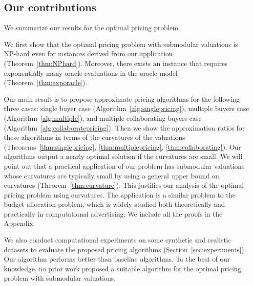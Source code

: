 \documentclass[letterpaper]{article}
\theoremstyle{definition}
\begin{document}




\subsection{Our contributions}

We summarize our results for the optimal pricing problem.

We first show that the optimal pricing problem with submodular valuations is NP-hard even for instances derived from our application (Theorem~\ref{thm:NPhard}).
Moreover, there exists an instance that requires exponentially many oracle evaluations in the oracle model (Theorem~\ref{thm:exporacle}).

Our main result is to propose approximate pricing algorithms for the following three cases: single buyer case (Algorithm~\ref{alg:singlepricing}), multiple buyers case (Algorithm~\ref{alg:multiple}), and multiple collaborating buyers case (Algorithm~\ref{alg:collaboratepricing}).
Then we show the approximation ratios for these algorithms in terms of the curvatures of the valuations (Theorems~\ref{thm:singlepricing}, \ref{thm:multiplepricing}, \ref{thm:collaborating}).
Our algorithms output a nearly optimal solution if the curvatures are small.
We will point out that a practical application of our problem has submodular valuations whose curvatures are typically small by using a general upper bound on curvatures (Theorem~\ref{thm:curvature}).
This justifies our analysis of the optimal pricing problem using curvatures.
The application is a similar problem to the budget allocation problem, which is widely studied both theoretically and practically in computational advertising.
We include all the proofs in the Appendix.


We also conduct computational experiments on some synthetic and realistic datasets to evaluate the proposed pricing algorithms (Section~\ref{sec:experiments}). %
Our algorithm performs better than baseline algorithms.
To the best of our knowledge, no prior work proposed a suitable algorithm for the optimal pricing problem with submodular valuations.
\end{document}
